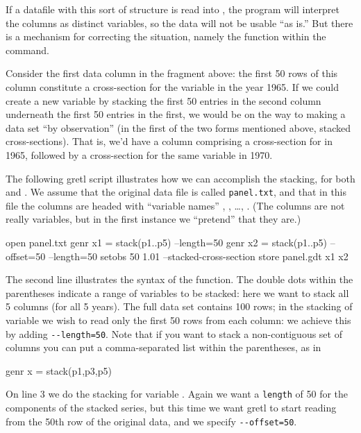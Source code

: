 If a datafile with this sort of structure is read into ,
the program will interpret the columns as distinct variables, so the
data will not be usable ``as is.''  But there is a mechanism for
correcting the situation, namely the  function within
the  command.

Consider the first data column in the fragment above: the first 50 rows
of this column constitute a cross-section for the variable 
in the year 1965.  If we could create a new variable by stacking the
first 50 entries in the second column underneath the first 50 entries
in the first, we would be on the way to making a data set ``by
observation'' (in the first of the two forms mentioned above, stacked
cross-sections).  That is, we'd have a column comprising a
cross-section for  in 1965, followed by a cross-section for
the same variable in 1970.

The following gretl script illustrates how we can accomplish the
stacking, for both  and .  We assume
that the original data file is called \texttt{panel.txt}, and that in
this file the columns are headed with ``variable names'' ,
, \dots, .  (The columns are not really
variables, but in the first instance we ``pretend'' that they are.)

\begin{code}
    open panel.txt
    genr x1 = stack(p1..p5) --length=50
    genr x2 = stack(p1..p5) --offset=50 --length=50
    setobs 50 1.01 --stacked-cross-section
    store panel.gdt x1 x2
\end{code}

The second line illustrates the syntax of the  function.
The double dots within the parentheses indicate a range of variables
to be stacked: here we want to stack all 5 columns (for all 5 years).
The full data set contains 100 rows; in the stacking of variable
 we wish to read only the first 50 rows from each column:
we achieve this by adding \verb+--length=50+.  Note that if you want
to stack a non-contiguous set of columns you can put a comma-separated
list within the parentheses, as in

\begin{code}
    genr x = stack(p1,p3,p5)
\end{code}

On line 3 we do the stacking for variable .  Again we want
a \texttt{length} of 50 for the components of the stacked series, but
this time we want gretl to start reading from the 50th row of the
original data, and we specify \verb+--offset=50+.

